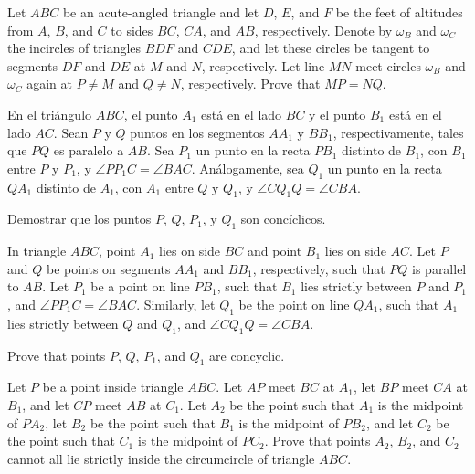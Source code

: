 \begin{probEG}[ISL 2019/G2]
	Let $ABC$ be an acute-angled triangle and let $D$, $E$, and $F$ be the feet of altitudes from $A$, $B$, and $C$ to sides $BC$, $CA$, and $AB$, respectively. Denote by $\omega_B$ and $\omega_C$ the incircles of triangles $BDF$ and $CDE$, and let these circles be tangent to segments $DF$ and $DE$ at $M$ and $N$, respectively. Let line $MN$ meet circles $\omega_B$ and $\omega_C$ again at $P\ne M$ and $Q\ne N$, respectively. Prove that $MP=NQ$.
\end{probEG}

\begin{probMG}
	En el triángulo $ABC$, el punto $A_1$ está en el lado $BC$ y el punto $B_1$ está en el lado $AC$. Sean $P$ y $Q$ puntos en los segmentos $AA_1$ y $BB_1$, respectivamente, tales que $PQ$ es paralelo a $AB$. Sea $P_1$ un punto en la recta $PB_1$ distinto de $B_1$, con $B_1$ entre $P$ y $P_1$, y $\angle PP_1C=\angle BAC$. Análogamente, sea $Q_1$ un punto en la recta $QA_1$ distinto de $A_1$, con $A_1$ entre $Q$ y $Q_1$, y $\angle CQ_1Q=\angle CBA$.

	Demostrar que los puntos $P$, $Q$, $P_1$, y $Q_1$ son concíclicos.
	\begin{hint}
		In triangle $ABC$, point $A_1$ lies on side $BC$ and point $B_1$ lies on side $AC$. Let $P$ and $Q$ be points on segments $AA_1$ and $BB_1$, respectively, such that $PQ$ is parallel to $AB$. Let $P_1$ be a point on line $PB_1$, such that $B_1$ lies strictly between $P$ and $P_1$, and $\angle PP_1C=\angle BAC$. Similarly, let $Q_1$ be the point on line $QA_1$, such that $A_1$ lies strictly between $Q$ and $Q_1$, and $\angle CQ_1Q=\angle CBA$.

		Prove that points $P$, $Q$, $P_1$, and $Q_1$ are concyclic.
	\end{hint}
\end{probMG}

\begin{probHG}[ISL 2019/G4]
	Let $P$ be a point inside triangle $ABC$. Let $AP$ meet $BC$ at $A_1$, let $BP$ meet $CA$ at $B_1$, and let $CP$ meet $AB$ at $C_1$. Let $A_2$ be the point such that $A_1$ is the midpoint of $PA_2$, let $B_2$ be the point such that $B_1$ is the midpoint of $PB_2$, and let $C_2$ be the point such that $C_1$ is the midpoint of $PC_2$. Prove that points $A_2$, $B_2$, and $C_2$ cannot all lie strictly inside the circumcircle of triangle $ABC$.
\end{probHG}

